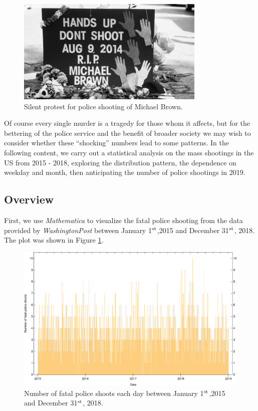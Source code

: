 \documentclass[conf]{new-aiaa}
\begin{document}
\begin{figure}[H]
	\centering
	\includegraphics[width=0.7\linewidth]{intro.png}  
	\caption{Silent protest for police shooting of Michael Brown.}  
\end{figure}

Of course every single murder is a tragedy for those whom it affects, but for the bettering of the police service and the benefit of broader society we may wish to consider whether these ``shocking'' numbers lead to some patterns. In the following content, we carry out a statistical analysis on the mass shootings in the US from 2015 - 2018, exploring the distribution pattern, the dependence on weekday and month, then anticipating the number of police shootings in 2019.

\subsection{Overview}

First, we use \emph{Mathematica} to visualize the fatal police shooting from the data provided by \emph{WashingtonPost}\cite{} between January 1$^{\rm st}$,2015 and December 31$^{\rm st}$, 2018. The plot was shown in Figure \ref{fig:q2}.

\begin{figure}[!htbp]
	\centering
	\includegraphics[width=0.9\linewidth]{q2/q2.eps}
	\caption{Number of fatal police shoots each day between January 1$^{\rm st}$,2015 and December 31$^{\rm st}$, 2018.}
	\label{fig:q2}
\end{figure}
\end{document}
